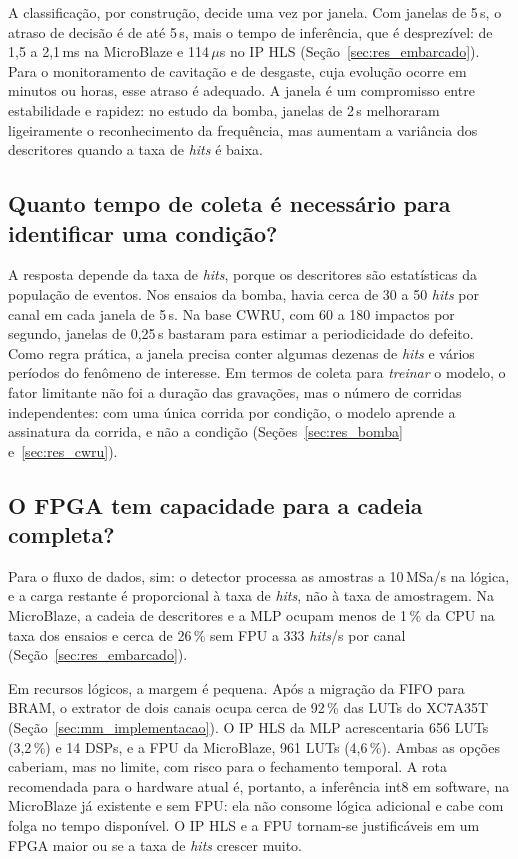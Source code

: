 A classificação, por construção, decide uma vez por janela. Com janelas de 5\,s, o atraso de decisão é de até 5\,s, mais o tempo de inferência, que é desprezível: de 1,5 a 2,1\,ms na MicroBlaze e 114\,\(\mu\)s no IP HLS (Seção~\ref{sec:res_embarcado}). Para o monitoramento de cavitação e de desgaste, cuja evolução ocorre em minutos ou horas, esse atraso é adequado. A janela é um compromisso entre estabilidade e rapidez: no estudo da bomba, janelas de 2\,s melhoraram ligeiramente o reconhecimento da frequência, mas aumentam a variância dos descritores quando a taxa de \textit{hits} é baixa.

\subsection{Quanto tempo de coleta é necessário para identificar uma condição?}

A resposta depende da taxa de \textit{hits}, porque os descritores são estatísticas da população de eventos. Nos ensaios da bomba, havia cerca de 30 a 50 \textit{hits} por canal em cada janela de 5\,s. Na base CWRU, com 60 a 180 impactos por segundo, janelas de 0,25\,s bastaram para estimar a periodicidade do defeito. Como regra prática, a janela precisa conter algumas dezenas de \textit{hits} e vários períodos do fenômeno de interesse. Em termos de coleta para \emph{treinar} o modelo, o fator limitante não foi a duração das gravações, mas o número de corridas independentes: com uma única corrida por condição, o modelo aprende a assinatura da corrida, e não a condição (Seções~\ref{sec:res_bomba} e~\ref{sec:res_cwru}).

\subsection{O FPGA tem capacidade para a cadeia completa?}

Para o fluxo de dados, sim: o detector processa as amostras a 10\,MSa/s na lógica, e a carga restante é proporcional à taxa de \textit{hits}, não à taxa de amostragem. Na MicroBlaze, a cadeia de descritores e a MLP ocupam menos de 1\,\% da CPU na taxa dos ensaios e cerca de 26\,\% sem FPU a 333 \textit{hits}/s por canal (Seção~\ref{sec:res_embarcado}).

Em recursos lógicos, a margem é pequena. Após a migração da FIFO para BRAM, o extrator de dois canais ocupa cerca de 92\,\% das LUTs do XC7A35T (Seção~\ref{sec:mm_implementacao}). O IP HLS da MLP acrescentaria 656 LUTs (3,2\,\%) e 14 DSPs, e a FPU da MicroBlaze, 961 LUTs (4,6\,\%). Ambas as opções caberiam, mas no limite, com risco para o fechamento temporal. A rota recomendada para o hardware atual é, portanto, a inferência int8 em software, na MicroBlaze já existente e sem FPU: ela não consome lógica adicional e cabe com folga no tempo disponível. O IP HLS e a FPU tornam-se justificáveis em um FPGA maior ou se a taxa de \textit{hits} crescer muito.

